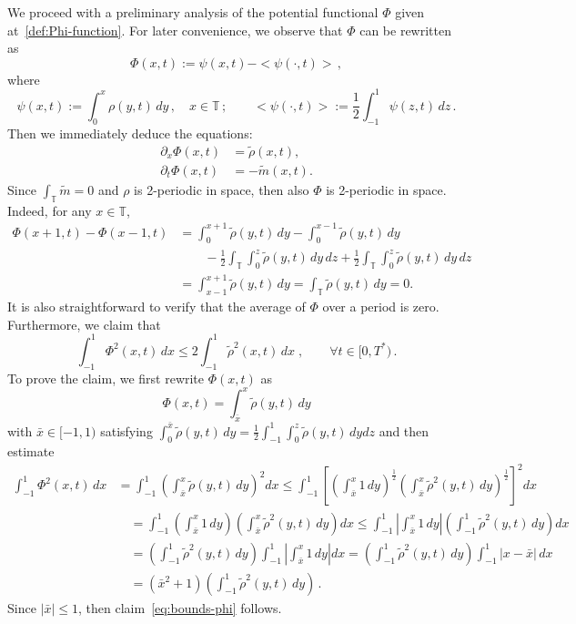 \documentclass[10pt,reqno]{amsart}
\newcommand{\bbt} {\mathbb T}
\begin{document}
We proceed with a preliminary analysis of the potential functional $ \Phi$ given at~\eqref{def:Phi-function}. For later convenience, we observe that $ \Phi$ can be rewritten as
\begin{equation}\label{def:potential_2}
    \Phi(x,t):= \psi(x,t)- <\psi(\cdot,t)>\,,      
\end{equation}
where %
\begin{equation} \psi(x,t) := \int_0^x\rho(y,t)\,dy\,,\quad x\in\bbt\,;\qquad
<\psi(\cdot,t)>:= \frac{1}{2}\int_{-1}^{1}\psi(z,t)\,dz    \,.
\end{equation}
Then we immediately deduce the equations:
\begin{align}
    \partial_x\Phi(x,t) & = \tilde\rho(x,t),\label{eq:partial-x-phi}\\
    \partial_t\Phi(x,t) & = - \tilde m(x,t).\label{eq:partial-t.phi}
\end{align}
Since $\int_{\bbt} \tilde m=0$ and $\rho$ is 2-periodic in space, then also $\Phi$ is 2-periodic in space.
Indeed, for any $x\in\bbt$,
\begin{align*}
    \Phi(x+1,t)  -\Phi(x-1,t)& =\int_0^{x+1}\tilde\rho(y,t)\,dy - \int_0^{x-1}\tilde\rho(y,t)\,dy\\
    &\qquad-\frac{1}{2}\int_\bbt\int_0^z\tilde\rho(y,t)\,dy\,dz + \frac{1}{2}\int_\bbt\int_0^z \tilde\rho(y,t)\,dy\,dz\\
    &   = \int_{x-1}^{x+1}\tilde\rho(y,t)\,dy = \int_\bbt\tilde \rho(y,t)\,dy = 0.
\end{align*}
It is also straightforward to verify that the average of $\Phi$
over a period is zero. Furthermore, we claim that
\begin{equation}\label{eq:bounds-phi}
    \int_{-1}^1 \Phi^2(x,t)\,dx \leq 2\int_{-1}^1\tilde \rho^2(x,t)\,dx\;,\qquad\forall t\in[0,T^*)\,.
\end{equation}
To prove the claim, we first rewrite $\Phi(x,t)$ as $$\Phi(x,t)=\int_{\bar x}^x \tilde\rho(y,t)\,dy$$ with $\bar x\in[-1,1)$ satisfying
$\int_0^{\bar x} \tilde\rho(y,t)\,dy = \frac{1}{2}\int_{-1}^1\int_0^z\tilde\rho(y,t)\,dydz$ and then estimate
\begin{align*}
    \int_{-1}^1 \Phi^2(x,t)\,dx & = \int_{-1}^1 \left( \int_{\bar x}^x\tilde\rho(y,t)\,dy \right)^2dx \leq \int_{-1}^1 \left[ \left( \int_{\bar x}^x1\,dy \right)^{\frac{1}{2}}\left( \int_{\bar x}^x\tilde\rho^2(y,t)\,dy \right)^{\frac{1}{2}} \right]^2dx \\
    &\quad = \int_{-1}^1 \left( \int_{\bar x}^x1\,dy \right)\left( \int_{\bar x}^x\tilde\rho^2(y,t)\,dy \right)dx \leq \int_{-1}^1 \left| \int_{\bar x}^x1\,dy \right|\left( \int_{-1}^1\tilde\rho^2(y,t)\,dy \right)dx \\
    &\quad = \left( \int_{-1}^1\tilde\rho^2(y,t)\,dy \right) \int_{-1}^1 \left| \int_{\bar x}^x1\,dy \right|dx = \left( \int_{-1}^1\tilde\rho^2(y,t)\,dy \right) \int_{-1}^1 \left| x-\bar x \right|\,dx\\
    &\quad = \left(\bar x^2+1\right)\left( \int_{-1}^1\tilde\rho^2(y,t)\,dy \right) 
    \,.
\end{align*}
Since $|\bar x|\le 1$, then claim~\eqref{eq:bounds-phi} follows.
\end{document}
